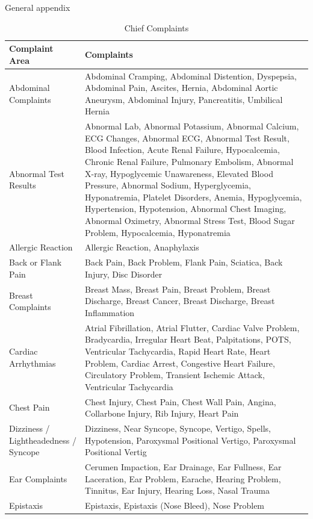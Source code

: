 \documentclass[,,nonblindrev]{informs}
\begin{document}
\clearpage

\begin{APPENDIX}{General appendix}

\begin{longtable}{|p{5cm}|p{12cm}|}
\caption{Chief Complaints} \\
\hline
\textbf{Complaint Area} & \textbf{Complaints} \\
\hline
Abdominal Complaints & Abdominal Cramping, Abdominal Distention, Dyspepsia, Abdominal Pain, Ascites, Hernia, Abdominal Aortic Aneurysm, Abdominal Injury, Pancreatitis, Umbilical Hernia \\
\hline
Abnormal Test Results & Abnormal Lab, Abnormal Potassium, Abnormal Calcium, ECG Changes, Abnormal ECG, Abnormal Test Result, Blood Infection, Acute Renal Failure, Hypocalcemia, Chronic Renal Failure, Pulmonary Embolism, Abnormal X-ray, Hypoglycemic Unawareness, Elevated Blood Pressure, Abnormal Sodium, Hyperglycemia, Hyponatremia, Platelet Disorders, Anemia, Hypoglycemia, Hypertension, Hypotension, Abnormal Chest Imaging, Abnormal Oximetry, Abnormal Stress Test, Blood Sugar Problem, Hypocalcemia, Hyponatremia \\
\hline
Allergic Reaction & Allergic Reaction, Anaphylaxis \\
\hline
Back or Flank Pain & Back Pain, Back Problem, Flank Pain, Sciatica, Back Injury, Disc Disorder \\
\hline
Breast Complaints & Breast Mass, Breast Pain, Breast Problem, Breast Discharge, Breast Cancer, Breast Discharge, Breast Inflammation \\
\hline
Cardiac Arrhythmias & Atrial Fibrillation, Atrial Flutter, Cardiac Valve Problem, Bradycardia, Irregular Heart Beat, Palpitations, POTS, Ventricular Tachycardia, Rapid Heart Rate, Heart Problem, Cardiac Arrest, Congestive Heart Failure, Circulatory Problem, Transient Ischemic Attack, Ventricular Tachycardia \\
\hline
Chest Pain & Chest Injury, Chest Pain, Chest Wall Pain, Angina, Collarbone Injury, Rib Injury, Heart Pain \\
\hline
Dizziness / Lightheadedness / Syncope & Dizziness, Near Syncope, Syncope, Vertigo, Spells, Hypotension, Paroxysmal Positional Vertigo, Paroxysmal Positional Vertig \\
\hline
Ear Complaints & Cerumen Impaction, Ear Drainage, Ear Fullness, Ear Laceration, Ear Problem, Earache, Hearing Problem, Tinnitus, Ear Injury, Hearing Loss, Nasal Trauma \\
\hline
Epistaxis & Epistaxis, Epistaxis (Nose Bleed), Nose Problem \\

\end{longtable}
\end{APPENDIX}
\end{document}
